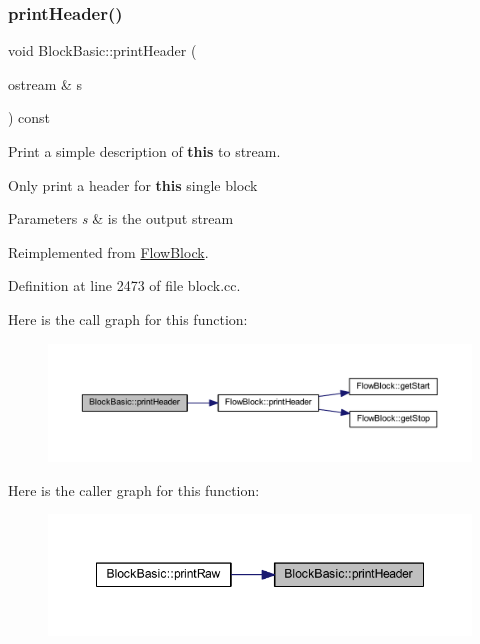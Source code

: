 \subsubsection{\texorpdfstring{printHeader()}{printHeader()}}
{\footnotesize\ttfamily void Block\+Basic\+::print\+Header (\begin{DoxyParamCaption}\item[{ostream \&}]{s }\end{DoxyParamCaption}) const\hspace{0.3cm}{\ttfamily [virtual]}}



Print a simple description of {\bfseries{this}} to stream. 

Only print a header for {\bfseries{this}} single block 
\begin{DoxyParams}{Parameters}
{\em s} & is the output stream \\
\hline
\end{DoxyParams}


Reimplemented from \mbox{\hyperlink{class_flow_block_a0d19c5b80186cf289dfbe0ce9e3ce37a}{Flow\+Block}}.



Definition at line 2473 of file block.\+cc.

Here is the call graph for this function\+:
\nopagebreak
\begin{figure}[H]
\begin{center}
\leavevmode
\includegraphics[width=350pt]{class_block_basic_a5a0f22c6bd8b164e787dc6a6d756952a_cgraph}
\end{center}
\end{figure}
Here is the caller graph for this function\+:
\nopagebreak
\begin{figure}[H]
\begin{center}
\leavevmode
\includegraphics[width=348pt]{class_block_basic_a5a0f22c6bd8b164e787dc6a6d756952a_icgraph}
\end{center}
\end{figure}
\mbox{\label{class_block_basic_a5981c3195bd4c3fd7be7e750a580bbca}} 
